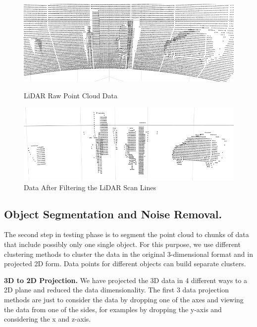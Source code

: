 \begin{figure}[!h]
\centering
\begin{minipage}{0.49\textwidth}
  \centering
        \includegraphics[width=.9\linewidth]{images/ground_before2.png}
        \caption{LiDAR Raw Point Cloud Data}
        \label{fig:ground_before}
\end{minipage}%
\begin{minipage}{0.49\textwidth}
  \centering
        \includegraphics[width=.9\linewidth]{images/ground_after2.png}
        \caption{Data After Filtering the LiDAR Scan Lines}
        \label{fig:after}
\end{minipage}%
\end{figure}
%
%
\subsection{Object Segmentation and Noise Removal.}
The %
second
step in testing phase is to segment the point cloud to chunks of data that include
possibly only one single object. For this purpose, we use different clustering
methods to cluster the data in the original 3-dimensional format and in projected 2D form.
Data points for different objects can build separate clusters.


\textbf{3D to 2D Projection.}
We have projected the 3D data in 4 different ways to a 2D plane and reduced the data dimensionality.
The first 3 data projection methods are just to consider the data by dropping one of the axes and
viewing the data from one of the sides, for examples by dropping the y-axis and considering the x
and z-axis.

